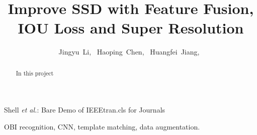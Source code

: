 \documentclass[journal,conference]{IEEEtran}
\begin{document}
\newfontfamily{}
\newcommand{\code}[1]{{\cl #1}}

%
\title{Improve SSD with Feature Fusion, \\IOU Loss and Super Resolution}
%
%
%

\author{
  Jingyu~Li,~
  Haoping~Chen,~
  Huangfei~Jiang,~
}

%
{Shell \MakeLowercase{\textit{et al.}}: Bare Demo of IEEEtran.cls for Journals}
%


\maketitle

\begin{abstract}
  In this project
\end{abstract}

\begin{IEEEkeywords}
  OBI recognition, CNN, template matching, data augmentation.
\end{IEEEkeywords}
\end{document}

